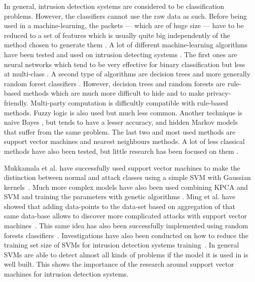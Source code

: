 In general, intrusion detection systems are considered to be classification problems. However, the classifiers cannot use the raw data as such. Before being used in a machine-learning, the packets --- which are of huge size --- have to be reduced to a set of features \cite{Winter2018} which is usually quite big independently of the method chosen to generate them \cite{Sekar2002Specification-basedDetection,Cho2003EfficientModel} \cite{NewsomePolygraph:Worms}. A lot of different machine-learning algorithms have been tested and used on intrusion detecting systems \cite{Tsai2009IntrusionReview}. The first ones are neural networks which tend to be very effective for binary classification but less at multi-class \cite{Mukkamala2002IntrusionMachines,Akashdeep2017AClassifier,Farnaaz2016RandomSystem}. A second type of algorithms are decision trees \cite{Meeragandhi2010EffectiveRules,Papamartzivanos2018Dendron:Systems} and more generally random forest classifiers \cite{Soheily-Khah2018IntrusionDataset}. However, decision trees and random forests are rule-based methods which are much more difficult to hide and to make privacy-friendly. Multi-party computation is difficultly compatible with rule-based methods. Fuzzy logic \cite{Shanmugavadivu2011NetworkLogic,Rout2015ADetection} is also used but much less common. Another technique is naive Bayes \cite{Chebrolu2005FeatureSystems}, but tends to have a lesser accuracy, and hidden Markov models \cite{Chen2016AnomalyModel,Tsai2007DetectingModels} that suffer from the same problem. The last two and most used methods are support vector machines and nearest neighbours methods. A lot of less classical methods have also been tested, but little research has been focused on them \cite{Sabhnani2003ApplicationContext}.

Mukkamala et al. have successfully used support vector machines to make the distinction between normal and attack classes using a simple SVM with Gaussian kernels~\cite{Mukkamala2002IntrusionMachines}. Much more complex models have also been used combining KPCA and SVM and training the parameters with genetic algorithms \cite{Kuang2014ADetection}. Ming et al. have showed that adding data-points to the data-set based on aggregation of that same data-base allows to discover more complicated attacks with support vector machines~\cite{MingTian2004UsingAttacks}. This same idea has also been successfully implemented using random forests classifiers~\cite{Akashdeep2017AClassifier}.  Investigations have also been conducted on how to reduce the training set size of SVMs for intrusion detection systems training~\cite{Khan2007AClustering,Al-Yaseen2017Multi-levelSystem}. In general SVMs are able to detect almost all kinds of problems if the model it is used in is well built. This shows the importance of the research around support vector machines for intrusion detection systems. 

